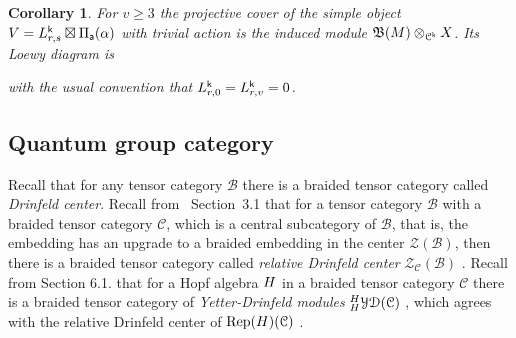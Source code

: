 \documentclass[a4paper, reqno]{amsart}
\newtheorem{corollary}[theorem]{Corollary}
\theoremstyle{introTheorems}
\newcommand\cB{\mathcal{B}}
\newcommand\cC{\mathcal{C}}
\newcommand\cZ{\mathcal{Z}}
\newcommand\Rep{\textup{Rep}}
\renewcommand{\1}{\mathbbold{1}}
\begin{document}
\begin{corollary}
For $v\geq 3$ the projective cover of the simple object $V=L^{\mathsf{k}}_{r,s}\boxtimes \Pi_{\mathsf{a}}(\alpha)$ with trivial action is the induced module $\NicholsOf(M)\otimes_{\cC^\k} X$. Its Loewy diagram is 
 \begin{center}
\end{center}   
with the usual convention that $L^{\mathsf{k}}_{r, 0} = L^{\mathsf{k}}_{r, v} = 0$. 
\end{corollary}



\subsection{Quantum group category}\label{subsec:QuantumGroup}

Recall that for any tensor category $\cB$ there is a braided tensor category called \emph{Drinfeld center}.
Recall from \cite{CLR23}~Section~3.1 that for a tensor category $\cB$ with a braided tensor category $\cC$, which is a central subcategory of $\cB$, that is, the embedding has an upgrade to a braided embedding in the center $\cZ(\cB)$, then there is a braided tensor category called \emph{relative Drinfeld center} $\cZ_\cC(\cB)$ \cites{Maj95,Lau20}. Recall from \cite{CLR23} Section 6.1. that for a Hopf algebra $H$ in a braided tensor category $\cC$ there is a braided tensor category of \emph{Yetter-Drinfeld modules} $\YD{\Nichols}(\cC)$ \cite{Besp95}, which agrees with the relative Drinfeld center of $\Rep(\Nichols)(\cC)$ \cite{Lau20}.
\end{document}
